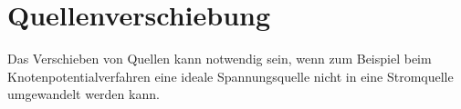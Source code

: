 



\newpage
\section{Quellenverschiebung}
Das Verschieben von Quellen kann notwendig sein, wenn zum Beispiel beim Knotenpotentialverfahren eine ideale Spannungsquelle nicht in eine Stromquelle umgewandelt werden kann. 

